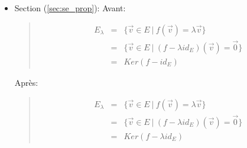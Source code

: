 \begin{itemize}
\begin{itemize}
      \item Section (\ref{sec:se_prop}): Avant:
        \begin{quote}
          \begin{eqnarray*}
            E_{\lambda} &=& \{\vec{v} \in E ~ \vert ~ f(\vec{v}) = \lambda\vec{v} \} \\
              &=& \{\vec{v} \in E ~ \vert ~ (f-\lambda id_E)(\vec{v}) = \vec{0} \} \\
              &=& Ker(f - id_E)
          \end{eqnarray*}
        \end{quote}
        Après:
        \begin{quote}
          \begin{eqnarray*}
            E_{\lambda} &=& \{\vec{v} \in E ~ \vert ~ f(\vec{v}) = \lambda\vec{v} \} \\
              &=& \{\vec{v} \in E ~ \vert ~ (f-\lambda id_E)(\vec{v}) = \vec{0} \} \\
              &=& Ker(f - \lambda id_E)
          \end{eqnarray*}
        \end{quote}
        
    \end{itemize}
    

\end{itemize}
